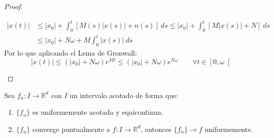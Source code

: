 \begin{ejercicio}
\begin{proof}
\begin{itemize}
                \begin{align*}
                    |x(t)| &\leq |x_0| + \int_{0}^{t} [M(s)|x(s)| + n(s)]~ds  \leq |x_0| + \int_{0}^{t} [M|x(s)| + N]~ds  \\
                           &\leq |x_0| + N\omega + M\int_{0}^{t} |x(s)|~ds
                \end{align*}
                Por lo que aplicando el Lema de Gronwall:
                \begin{equation*}
                    |x(t)| \leq (|x_0| + N\omega) e^{Mt} \leq (|x_0| + N\omega) e^{N\omega} \qquad \forall t\in \left[0,\omega\right[
                \end{equation*}
        \end{itemize}
    \end{proof}
\end{ejercicio}

\begin{ejercicio} %
    Sea $f_n:I\to \mathbb{R}^d$ con $I$ un intervalo acotado de forma que:
    \begin{enumerate}
        \item $\{f_n\}$ es uniformemente acotada y equicontinua.
        \item $\{f_n\}$ converge puntualmente a $f:I\to \mathbb{R}^d$, entonces $\{f_n\}\to f$ uniformemente.
    \end{enumerate}
\end{ejercicio}
